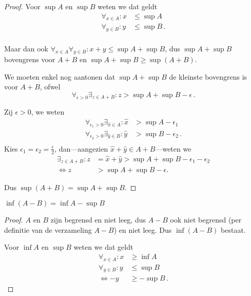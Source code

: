 \documentclass[week=1]{homework}
\begin{document}
\begin{questions}
\begin{parts}
\begin{proof}
	        		Voor $\sup A$ en $\sup B$ weten we dat geldt
	        		\begin{align*}
	        			\forall_{x \in A}: x &\leq \sup A \\
	        			\forall_{y \in B}: y &\leq \sup B\,. \\
	        		\end{align*}
	        		
	        		Maar dan ook $\forall_{x\in A}\forall_{y \in B}: x + y \leq \sup A + \sup B$, dus $\sup A + \sup B$ bovengrens voor $A+B$ en $\sup A + \sup B \geq \sup(A+B)$. 
	        		
	        		We moeten enkel nog aantonen dat $\sup A + \sup B$ de kleinste bovengrens is voor $A+B$, ofwel
	        		\[
		        		\forall_{\epsilon > 0}\exists_{z \in A+B}: z > \sup A + \sup B - \epsilon\,.
	        		\]
	        		
	        		Zij $\epsilon > 0$, we weten
	        		\begin{align*}
	        			\forall_{\epsilon_1 > 0}\exists_{\hat x \in A}: \hat x &> \sup A - \epsilon_1 \\
	        			\forall_{\epsilon_2 > 0}\exists_{\hat y \in B}: \hat y &> \sup B - \epsilon_2 \,. \\
	        		\end{align*}
	        		Kies $\epsilon_1 = \epsilon_2 = \frac{\epsilon}{2}$, dan---aangezien $\hat x + \hat y \in A+B$---weten we
			        \begin{align*}
			        	\exists_{z \in A+B}: z &= \hat x + \hat y > \sup A + \sup B - \epsilon_1 - \epsilon_2 \\
			        	\Leftrightarrow z &> \sup A + \sup B - \epsilon.
			        \end{align*}
			        
			        Dus $\sup (A+B) = \sup A + \sup B$.
	        	\end{proof}
        	
	        	\begin{toprove}
	        		$\inf (A-B) = \inf A - \sup B$
	        	\end{toprove}
	        	\begin{proof}
	        		$A$ en $B$ zijn begrensd en niet leeg, dus $A-B$ ook niet begrensd (per definitie van de verzameling $A-B$) en niet leeg. Dus $\inf(A-B)$ bestaat.
	        		
	        		Voor $\inf A$ en $\sup B$ weten we dat geldt
	        		\begin{align*}
	        		\forall_{x \in A}: x &\geq \inf A \\
	        		\forall_{y \in B}: y &\leq \sup B \\
	        		\Leftrightarrow -y &\geq -\sup B\,.
	        		\end{align*}
	        		

\end{proof}
\end{parts}
\end{questions}
\end{document}
